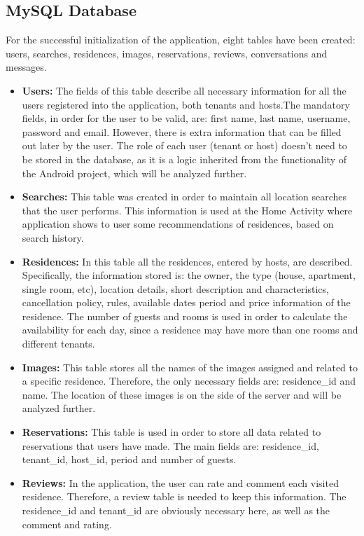 \documentclass[12pt]{article}
\begin{document}
	\subsection{MySQL Database}
	
	For the successful initialization of the application, eight tables have been created: users, searches, residences, images, reservations, reviews, conversations and messages. 
	
	\begin{itemize}
		
		\item \textbf{Users:} The fields of this table describe all necessary information for all the users registered into the application, both tenants and hosts.The mandatory fields, in order for the user to be valid, are: first name, last name, username, password and email. However, there is extra information that can be filled out later by the user. The role of each user (tenant or host) doesn't need to be stored in the database, as it is a logic inherited from the functionality of the Android project, which will be analyzed further.
		\item \textbf{Searches:} This table was created in order to maintain all location searches that the user performs. This information is used at the Home Activity where application shows to user some recommendations of residences, based on search history.
		\item \textbf{Residences:} In this table all the residences, entered by hosts, are described. Specifically, the information stored is: the owner, the type (house, apartment, single room, etc), location details, short description and characteristics, cancellation policy, rules, available dates period and price information of the residence. The number of guests and rooms is used in order to calculate the availability for each day, since a residence may have more than one rooms and different tenants.
		\item \textbf{Images:} This table stores all the names of the images assigned and related to a specific residence. Therefore, the only necessary fields are: residence\_id and name. The location of these images is on the side of the server and will be analyzed further.
		\item \textbf{Reservations:} This table is used in order to store all data related to reservations that users have made. The main fields are: residence\_id, tenant\_id, host\_id, period and number of guests.
		\item \textbf{Reviews:} In the application, the user can rate and comment each visited residence. Therefore, a review table is needed to keep this information. The residence\_id and tenant\_id are obviously necessary here, as well as the comment and rating.

\end{itemize}
\end{document}
